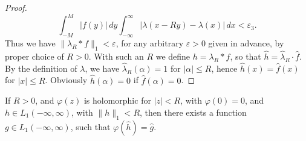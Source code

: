\begin{proof}
\begin{equation*}
\int_{-M}^{M}|f(y)|\,dy\int_{-\infty}^{\infty}|\lambda(x-Ry)-\lambda(x)|\,dx<\varepsilon_3.
\end{equation*}
Thus we have $\|\lambda_R*f\|_1<\varepsilon$, for any arbitrary $\varepsilon>0$ given in advance, by proper choice of $R>0$. With such an $R$ we define $h=\lambda_R*f$, so that $\widehat h=\widehat\lambda_R\cdot\widehat f$. By the definition of $\lambda$, we have $\widehat\lambda_R(\alpha)=1$ for $|\alpha|\le R$, hence $\widehat h(x)=\widehat f(x)$ for $|x|\le R$. Obviously $\widehat h(\alpha)=0$ if $\widehat f(\alpha)=0$.
\end{proof}

\begin{theorem}\label{thm:I-20}
If $R>0$, and $\varphi(z)$ is holomorphic for $|z|<R$, with $\varphi(0)=0$, and $h\in L_1(-\infty,\infty)$, with $\|h\|_1<R$, then there exists a function $g\in L_1(-\infty,\infty)$, such that $\varphi(\widehat h)=\widehat g$.
\end{theorem}

